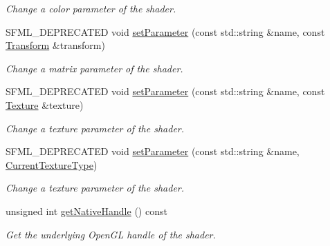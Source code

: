 \begin{DoxyCompactItemize}
\begin{DoxyCompactList}\small\item\em Change a color parameter of the shader. \end{DoxyCompactList}\item 
S\+F\+M\+L\+\_\+\+D\+E\+P\+R\+E\+C\+A\+T\+ED void \hyperlink{classsf_1_1_shader_a398a802fc5295ab69b0317892b0f0c75}{set\+Parameter} (const std\+::string \&name, const \hyperlink{classsf_1_1_transform}{Transform} \&transform)
\begin{DoxyCompactList}\small\item\em Change a matrix parameter of the shader. \end{DoxyCompactList}\item 
S\+F\+M\+L\+\_\+\+D\+E\+P\+R\+E\+C\+A\+T\+ED void \hyperlink{classsf_1_1_shader_a08c7cafd4f73ab898319c4fd7d8b5501}{set\+Parameter} (const std\+::string \&name, const \hyperlink{classsf_1_1_texture}{Texture} \&texture)
\begin{DoxyCompactList}\small\item\em Change a texture parameter of the shader. \end{DoxyCompactList}\item 
S\+F\+M\+L\+\_\+\+D\+E\+P\+R\+E\+C\+A\+T\+ED void \hyperlink{classsf_1_1_shader_a0fa7ecad14206e4d5edae1d6aa87f553}{set\+Parameter} (const std\+::string \&name, \hyperlink{structsf_1_1_shader_1_1_current_texture_type}{Current\+Texture\+Type})
\begin{DoxyCompactList}\small\item\em Change a texture parameter of the shader. \end{DoxyCompactList}\item 
unsigned int \hyperlink{classsf_1_1_shader_ac14d0bf7afe7b6bb415d309f9c707188}{get\+Native\+Handle} () const
\begin{DoxyCompactList}\small\item\em Get the underlying Open\+GL handle of the shader. \end{DoxyCompactList}\end{DoxyCompactItemize}
